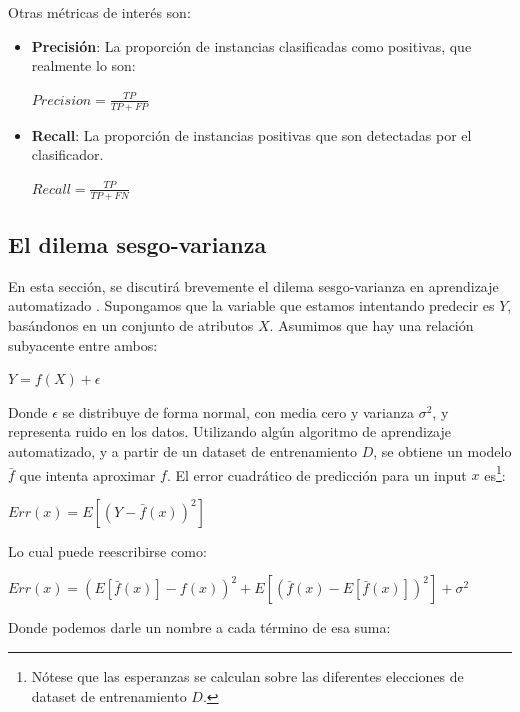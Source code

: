 Otras métricas de interés son:

\begin{itemize}
\item \textbf{Precisión}: La proporción de instancias clasificadas como positivas, que realmente lo son:
\begin{center}
$ Precision =  \frac{TP}{TP + FP}$
\end{center}

\item \textbf{Recall}: La proporción de instancias positivas que son detectadas por el clasificador.
\begin{center}
$ Recall =  \frac{TP}{TP + FN}$
\end{center}

\end{itemize}

\subsection{El dilema sesgo-varianza}

En esta sección, se discutirá brevemente el dilema sesgo-varianza en aprendizaje automatizado \cite{statisticallearning}. Supongamos que la variable que estamos intentando predecir es $Y$, basándonos en un conjunto de atributos $X$. Asumimos que hay una relación subyacente entre ambos:

\begin{center}
$Y = f(X) + \epsilon$
\end{center}

Donde $\epsilon$ se distribuye de forma normal, con media cero y varianza $\sigma^2$, y representa ruido en los datos. Utilizando algún algoritmo de aprendizaje automatizado, y a partir de un dataset de entrenamiento $D$, se obtiene un modelo $\bar{f}$ que intenta aproximar $f$. El error cuadrático de predicción para un input $x$ es\footnote{Nótese que las esperanzas se calculan sobre las diferentes elecciones de dataset de entrenamiento $D$.}:

\begin{center}
$Err(x) = E[(Y-\bar{f}(x))^2]$
\end{center}

Lo cual puede reescribirse como:

\begin{center}
$Err(x) = (E[\bar{f}(x)]-f(x))^2 + E[(\bar{f}(x)-E[\bar{f}(x)])^2] + \sigma^2$ 
\end{center}

Donde podemos darle un nombre a cada término de esa suma:

